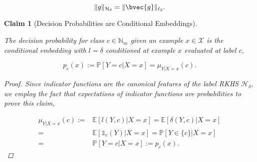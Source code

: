 \documentclass{article}
\newtheorem{claim}{Claim}[theorem]
\begin{document}
	\begin{equation}
		\lVert g \rVert_{\mathcal{H}_{\delta}} = \lVert \bvec{g} \rVert_{\ell_{2}}.
	\label{eq:rkhs_norm_is_l2_norm}
	\end{equation}

	
	\begin{claim}[Decision Probabilities are Conditional Embeddings]
	\label{thm:probability_is_embedding}
	
		The decision probability for class $c \in \mathbb{N}_{m}$ given an example $x \in \mathcal{X}$ is the conditional embedding with $l = \delta$ conditioned at example $x$ evaluated at label $c$,
			
		\begin{equation}
			p_{c}(x) := \mathbb{P}[Y = c | X = x] = \mu_{Y | X = x}(c).
		\end{equation}
		
		
		\begin{proof} Since indicator functions are the canonical features of the label RKHS $\mathcal{H}_{\delta}$, we employ the fact that expectations of indicator functions are probabilities to prove this claim,
			
			\begin{equation}
			\begin{aligned}
				\mu_{Y | X = x}(c) :=& \mathbb{E}[l(Y, c) | X = x ]= \mathbb{E}[\delta(Y, c) | X = x] \\
				=& \mathbb{E}[\mathbb{1}_{c}(Y) | X = x] = \mathbb{P}[Y \in \{c\} | X = x] \\
				=& \mathbb{P}[Y = c | X = x] := p_{c}(x).
			\end{aligned}
			\end{equation}
		\end{proof}

	\end{claim}
	
\end{document}
